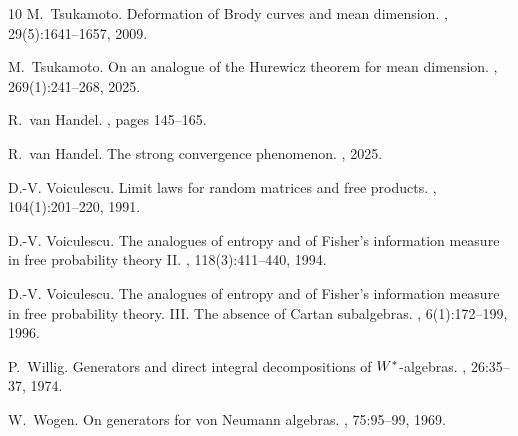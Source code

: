 \documentclass[10pt]{amsart}
\theoremstyle{definition}
\numberwithin{equation}{section}
\begin{document}
\begin{thebibliography}{10}
M.~Tsukamoto.
\newblock Deformation of {B}rody curves and mean dimension.
, 29(5):1641--1657, 2009.

M.~Tsukamoto.
\newblock On an analogue of the {H}urewicz theorem for mean dimension.
, 269(1):241--268, 2025.

R.~van Handel.
, pages 145--165.

R.~van Handel.
\newblock The strong convergence phenomenon.
, 2025.

D.-V. Voiculescu.
\newblock Limit laws for random matrices and free products.
, 104(1):201--220, 1991.

D.-V. Voiculescu.
\newblock The analogues of entropy and of {F}isher's information measure in free probability theory {II}.
, 118(3):411--440, 1994.

D.-V. Voiculescu.
\newblock The analogues of entropy and of {F}isher's information measure in free probability theory. {III}. {T}he absence of {C}artan subalgebras.
, 6(1):172--199, 1996.

P.~Willig.
\newblock Generators and direct integral decompositions of {$W\sp{\ast} $}-algebras.
, 26:35--37, 1974.

W.~Wogen.
\newblock On generators for von {N}eumann algebras.
, 75:95--99, 1969.

\end{thebibliography}

%
%
%
%
\end{document}
